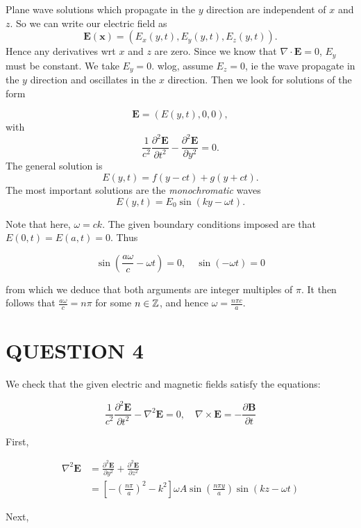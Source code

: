 \documentclass[a4paper]{article}
\begin{document}
Plane wave solutions which propagate in the $y$ direction are independent of $x$ and $z$. So we can write our electric field as
\[
\mathbf{E}(\mathbf{x}) = (E_x(y, t), E_y(y, t), E_z(y, t)).
\]
Hence any derivatives wrt $x$ and $z$ are zero. Since we know that $\nabla \cdot \mathbf{E} = 0$, $E_y$ must be constant. We take $E_y = 0$. wlog, assume $E_z = 0$, ie the wave propagate in the $y$ direction and oscillates in the $x$ direction. Then we look for solutions of the form

\[
\mathbf{E} = (E(y, t), 0, 0),
\]
with
\[
\frac{1}{c^2}\frac{\partial^2 \mathbf{E}}{\partial t^2} - \frac{\partial^2 \mathbf{E}}{\partial y^2} = 0.
\]
The general solution is
\[
E(y, t) = f(y - ct) + g(y + ct).
\]
The most important solutions are the \emph{monochromatic} waves
\[
E(y,t) = E_0 \sin (ky - \omega t).
\]

Note that here, $ \omega = c k $. The given boundary conditions imposed are that $ E(0,t) = E(a,t) = 0 $. Thus

\[ \sin \left( \frac{a \omega}{c} - \omega t  \right) = 0, \quad \sin(- \omega t) = 0 \]

from which we deduce that both arguments are integer multiples of $ \pi $. It then follows that $ \frac{a \omega}{c} = n \pi $ for some $ n \in \mathbb{Z} $, and hence $ \omega = \frac{n \pi c}{a}  $.







\section{QUESTION 4}


We check that the given electric and magnetic fields satisfy the equations:

\[ \frac{1}{c^{2}} \frac{\partial^{2} \mathbf{E} }{\partial t^{2}} - \nabla^{2} \mathbf{E} = 0 , \quad \nabla \times \mathbf{E} = - \frac{\partial \mathbf{B} }{\partial t}  \]

First, 

\begin{align*}
 \nabla^{2} \mathbf{E} & = \frac{\partial^{2} \mathbf{E} }{\partial y^{2}} + \frac{\partial^{2} \mathbf{E} }{\partial z^{2}} \\
& = \left[  - \left( \frac{n \pi}{a} \right)^{2}  - k^{2} \right]  \omega A \sin \left( \frac{n \pi y}{a} \right) \sin(kz - \omega t) 
\end{align*}

Next,
\end{document}
